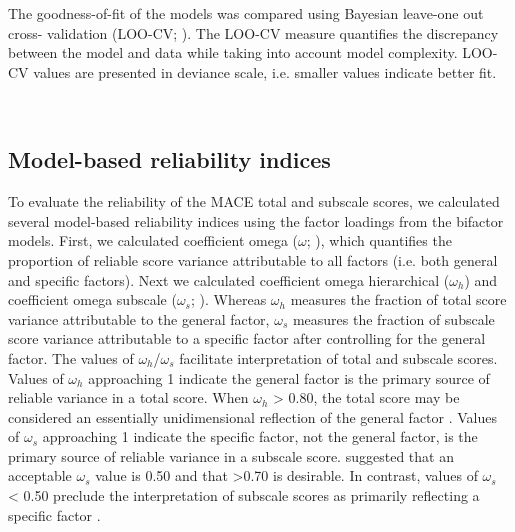 \documentclass[letterpaper,man,natbib,noextraspace,floatsintext,longtable]{apa6}
\begin{document}
The goodness-of-fit of the models was compared using Bayesian leave-one out cross- validation (LOO-CV; \citealt{vehtari2017practical}). The LOO-CV measure quantifies the discrepancy between the model and data while taking into account model complexity. LOO-CV values are presented in deviance scale, i.e. smaller values indicate better fit.

{\begin{spacing}{0.2} \hfill \\ \end{spacing}} \subsection{Model-based reliability indices}

To evaluate the reliability of the MACE total and subscale scores, we calculated several model-based reliability indices using the factor loadings from the bifactor models. First, we calculated coefficient omega ($\omega$; \citealt{mcdonald2013test}), which quantifies the proportion of reliable score variance attributable to all factors (i.e. both general and specific factors). Next we calculated coefficient omega hierarchical ($\omega_h$) and coefficient omega subscale ($\omega_s$;  \citealt{reise2013scoring}). Whereas $\omega_h$ measures the fraction of total score variance attributable to the general factor, $\omega_s$ measures the fraction of subscale score variance attributable to a specific factor after controlling for the general factor. The values of $\omega_h$/$\omega_s$ facilitate interpretation of total and subscale scores. Values of $\omega_h$ approaching 1 indicate the general factor is the primary source of reliable variance in a total score. When $\omega_h$ > 0.80, the total score may be considered an essentially unidimensional reflection of the general factor \citep{rodriguez2016applying}. Values of $\omega_s$ approaching 1 indicate the specific factor, not the general factor, is the primary source of reliable variance in a subscale score. \cite{canivez2016bifactor} suggested that an acceptable $\omega_s$ value is 0.50 and that >0.70 is desirable. In contrast, values of $\omega_s$ < 0.50 preclude the interpretation of subscale scores as primarily reflecting a specific factor \citep{gignac2013bifactor}. 
\end{document}
